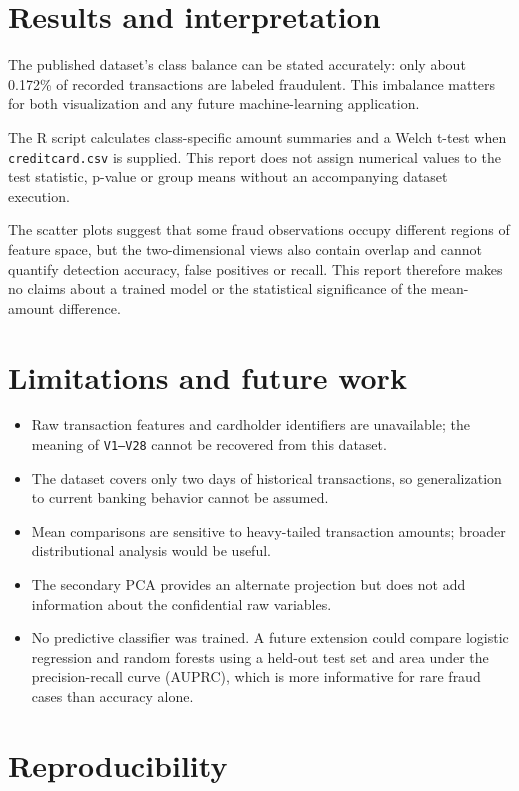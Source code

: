 \documentclass[11pt,a4paper]{article}
\begin{document}
\clearpage
\section{Results and interpretation}

The published dataset's class balance can be stated accurately: only about 0.172\% of recorded transactions are labeled fraudulent. This imbalance matters for both visualization and any future machine-learning application.

The R script calculates class-specific amount summaries and a Welch t-test when \texttt{creditcard.csv} is supplied. This report does not assign numerical values to the test statistic, p-value or group means without an accompanying dataset execution.

The scatter plots suggest that some fraud observations occupy different regions of feature space, but the two-dimensional views also contain overlap and cannot quantify detection accuracy, false positives or recall. This report therefore makes no claims about a trained model or the statistical significance of the mean-amount difference.

\section{Limitations and future work}

\begin{itemize}
  \item Raw transaction features and cardholder identifiers are unavailable; the meaning of \texttt{V1--V28} cannot be recovered from this dataset.
  \item The dataset covers only two days of historical transactions, so generalization to current banking behavior cannot be assumed.
  \item Mean comparisons are sensitive to heavy-tailed transaction amounts; broader distributional analysis would be useful.
  \item The secondary PCA provides an alternate projection but does not add information about the confidential raw variables.
  \item No predictive classifier was trained. A future extension could compare logistic regression and random forests using a held-out test set and area under the precision-recall curve (AUPRC), which is more informative for rare fraud cases than accuracy alone.
\end{itemize}

\section{Reproducibility}
\end{document}
